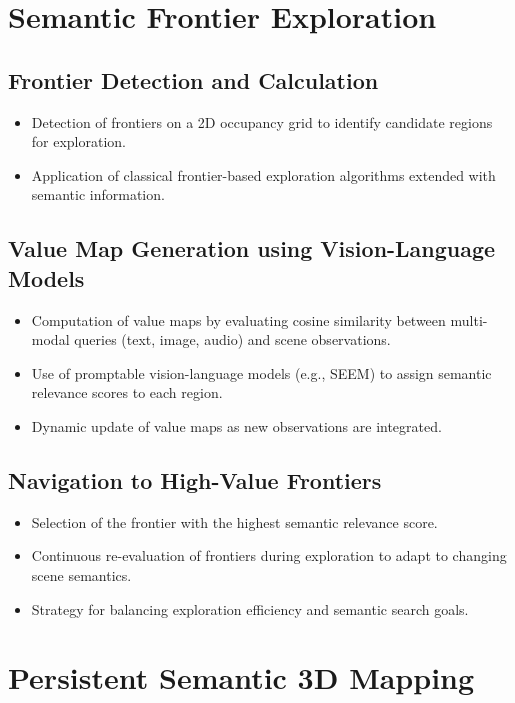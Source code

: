 \section{Semantic Frontier Exploration} \label{sec:semantic_frontier}\subsection{Frontier Detection and Calculation}
\begin{itemize}
    \item Detection of frontiers on a 2D occupancy grid to identify candidate regions for exploration.
    \item Application of classical frontier-based exploration algorithms extended with semantic information.
\end{itemize}

\subsection{Value Map Generation using Vision-Language Models}
\begin{itemize}
    \item Computation of value maps by evaluating cosine similarity between multi-modal queries (text, image, audio) and scene observations.
    \item Use of promptable vision-language models (e.g., SEEM) to assign semantic relevance scores to each region.
    \item Dynamic update of value maps as new observations are integrated.
\end{itemize}

\subsection{Navigation to High-Value Frontiers}
\begin{itemize}
    \item Selection of the frontier with the highest semantic relevance score.
    \item Continuous re-evaluation of frontiers during exploration to adapt to changing scene semantics.
    \item Strategy for balancing exploration efficiency and semantic search goals.
\end{itemize}

\section{Persistent Semantic 3D Mapping} \label{sec:persistent_mapping}

